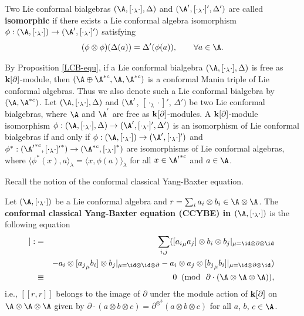 \documentclass[12pt]{amsart}
\begin{document}
    \begin{definition} Two Lie conformal bialgebras $(\A ,[\cdot_\lambda\cdot],\Delta)$ and $(\A ',[\cdot_\lambda\cdot]',\Delta')$
        are called  {\bf isomorphic} if there exists a Lie conformal algebra isomorphism $\phi: (\A ,[\cdot_\lambda\cdot])\rightarrow (\A ',[\cdot_\lambda\cdot]')$
        satisfying
        \begin{equation*}
            (\phi\otimes\phi)(\Delta(a))=\Delta'(\phi(a)),\qquad  \forall a\in \A.
        \end{equation*}
    \end{definition}
    \begin{remark}
       By Proposition \ref{LCB-equ}, if a  Lie conformal bialgebra $(\A,[\cdot_\lambda\cdot],\Delta)$ is free as ${\bf k}[\partial]$-module, then  $(\A\oplus \A^{\ast c}, \A, \A^{\ast c})$ is a conformal Manin triple of Lie conformal algebras. Thus we also denote such a Lie conformal bialgebra   by $(\A,\A^{*c})$.
        Let $(\A,[\cdot_\lambda \cdot], \Delta)$ and $(\A '$, $[\cdot_\lambda\cdot]'$, $\Delta')$ be two Lie conformal bialgebras, where $\A$ and $\A^{'}$ are free as ${\bf k}[\partial]$-modules.   A ${\bf k}[\partial]$-module isomorphism $\phi: (\A,[\cdot_\lambda \cdot], \Delta) \rightarrow (\A ',[\cdot_\lambda\cdot]',\Delta')$ is an isomorphism of Lie conformal bialgebras if and only if $\phi: (\A, [\cdot_\lambda \cdot])\rightarrow (\A ',[\cdot_\lambda\cdot]')$ and $\phi^\ast: ({\A'}^{\ast c}, {[\cdot_\lambda \cdot]'}^\ast)\rightarrow ({\A}^{\ast c}, {[\cdot_\lambda \cdot]}^\ast)$ are isomorphisms of Lie conformal algebras, where $\langle \phi^\ast(x), a\rangle_\lambda=\langle x, \phi(a)\rangle_\lambda$ for all $x\in {\A'}^{\ast c}$ and $a\in \A$.
    \end{remark}


    Recall the notion of the conformal classical Yang-Baxter equation.
    \begin{definition}\cite{L}
        Let $(\A,[\cdot_\lambda\cdot])$ be a Lie conformal algebra and $r=\sum_i a_i\otimes b_i\in \A\otimes \A$.   The {\bf conformal classical Yang-Baxter equation (CCYBE) in $(\A,[\cdot_\lambda\cdot])$} is
        the following equation
        \begin{eqnarray*}
            [\![r,r]\!]:&=& \sum_{i,j}([{a_i}_\mu a_j]\otimes b_i\otimes b_j|_{\mu=\id\otimes \partial\otimes \id}\\
            &&-a_i\otimes [{a_j}_\mu b_i]\otimes b_j|_{\mu=\id\otimes \id\otimes \partial}-a_i\otimes a_j\otimes [{b_j}_\mu b_i]|_{\mu=\id\otimes \partial\otimes \id})\\
            &\equiv &0 \;\; (\text{mod} ~~\partial \cdot (\A\otimes \A\otimes \A)),
        \end{eqnarray*}
        i.e., $[\![r,r]\!]$ belongs to the image of $\partial$ under the module action of ${\bf k}[\partial]$ on $\A\otimes \A\otimes \A$ given by $ \partial \cdot (a\otimes b\otimes c)=\partial^{\otimes^3}(a\otimes b\otimes c)$ for all $a$, $b$, $c\in \A$.

 
\end{definition}
 
\end{document}
